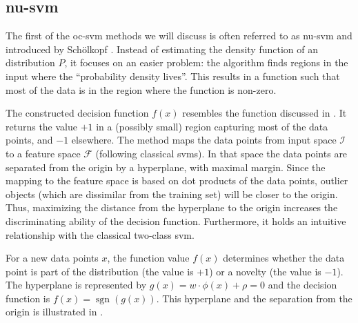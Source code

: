 



\subsection{\acrlong{nu-svm}}\label{subsec:nu-svm}
The first of the \gls{oc-svm} methods we will discuss is often referred to as \gls{nu-svm} and introduced by Sch\"olkopf \etal \cite{scholkopf1999support}.
Instead of estimating the density function of an distribution $P$, it focuses on an easier problem: the algorithm finds regions in the input where the ``probability density lives''.
This results in a function such that most of the data is in the region where the function is non-zero.

The constructed decision function $f(x)$ resembles the function discussed in .
It returns the value $+1$ in a (possibly small) region capturing most of the data points, and $-1$ elsewhere.
The method maps the data points from input space $\mathcal{I}$ to a feature space $\mathcal{F}$ (following classical \glspl{svm}).
In that space the data points are separated from the origin by a hyperplane, with maximal margin.
Since the mapping to the feature space is based on dot products of the data points, outlier objects (which are dissimilar from the training set) will be closer to the origin.
Thus, maximizing the distance from the hyperplane to the origin increases the discriminating ability of the decision function.
Furthermore, it holds an intuitive relationship with the classical two-class \gls{svm}.

For a new data points $x$, the function value $f(x)$ determines whether the data point is part of the distribution (\ie the value is $+1$) or a novelty (\ie the value is $-1$).
The hyperplane is represented by $g(x) = w \cdot \phi(x) + \rho = 0$ and the decision function is $f(x) = \operatorname{sgn}(g(x))$.
This hyperplane and the separation from the origin is illustrated in .

